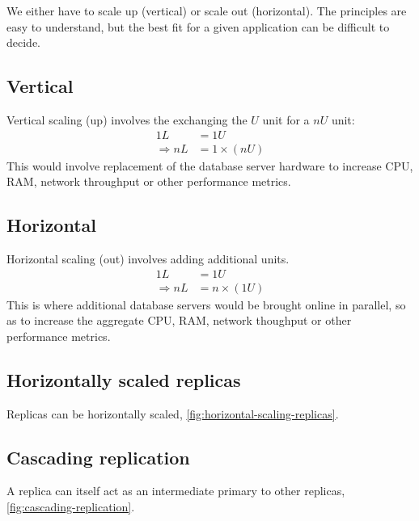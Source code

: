 We either have to scale up (vertical) or scale out (horizontal).
The principles are easy to understand, but the best fit for a given application can be difficult to decide.

\subsection{Vertical}

Vertical scaling (up) involves the exchanging the $U$ unit for a $nU$ unit:
\begin{align}
  1 L & = 1 U \\
  \Rightarrow n L & = 1 \times ( n U ) 
\end{align}
This would involve replacement of the database server hardware to increase CPU, RAM, network throughput or other performance metrics.

\subsection{Horizontal}

Horizontal scaling (out) involves adding additional units.
\begin{align}
  1 L & = 1 U \\
  \Rightarrow n L & = n \times ( 1 U ) 
\end{align}
This is where additional database servers would be brought online in parallel, so as to increase the aggregate CPU, RAM, network thoughput or other performance metrics. 

\subsection{Horizontally scaled replicas}

Replicas can be horizontally scaled, \autoref{fig:horizontal-scaling-replicas}.


\subsection{Cascading replication}

A replica can itself act as an intermediate primary to other replicas, \autoref{fig:cascading-replication}.


